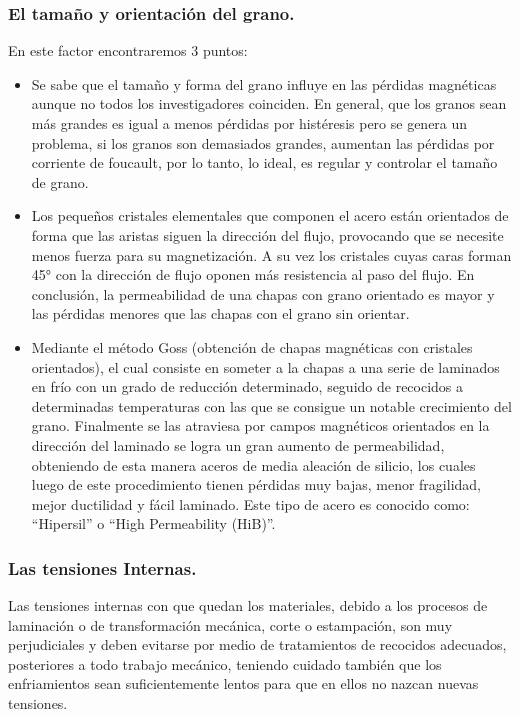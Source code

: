 \documentclass[12pt,a4paper]{article}
\begin{document}
\subsubsection{El tamaño y orientación del grano.}

En este factor encontraremos 3 puntos:
\begin{itemize}
    \item Se sabe que el tamaño y forma del grano influye en las pérdidas magnéticas aunque no todos los investigadores coinciden. En general, que los granos sean más grandes es igual a menos pérdidas por histéresis pero se genera un problema, si los granos son demasiados grandes, aumentan las pérdidas por corriente de foucault, por lo tanto, lo ideal, es regular y controlar el tamaño de grano.
    \item Los pequeños cristales elementales que componen el acero están orientados de forma que las aristas siguen la dirección del flujo, provocando que se necesite menos fuerza para su magnetización. A su vez los cristales cuyas caras forman 45° con la dirección de flujo oponen más resistencia al paso del flujo. En conclusión, la permeabilidad de una chapas con grano orientado es mayor y las pérdidas menores que las chapas con el grano sin orientar.
    \item Mediante el método Goss (obtención de chapas magnéticas con cristales orientados), el cual consiste en someter a la chapas a una serie de laminados en frío con un grado de reducción determinado, seguido de recocidos a determinadas temperaturas con las que se consigue un notable crecimiento del grano. Finalmente se las atraviesa por campos magnéticos orientados en la dirección del laminado se logra un gran aumento de permeabilidad, obteniendo de esta manera aceros de media aleación de silicio, los cuales luego de este procedimiento tienen pérdidas muy bajas, menor fragilidad, mejor ductilidad y fácil laminado. Este tipo de acero es conocido como: “Hipersil” o “High Permeability (HiB)”.
\end{itemize}

\subsubsection{Las tensiones Internas.}
Las tensiones internas con que quedan los materiales, debido a los procesos de laminación o de transformación mecánica, corte o estampación, son muy perjudiciales y deben evitarse por medio de tratamientos de recocidos adecuados, posteriores a todo trabajo mecánico, teniendo cuidado también que los enfriamientos sean suficientemente lentos para que en ellos no nazcan nuevas tensiones.
\end{document}

